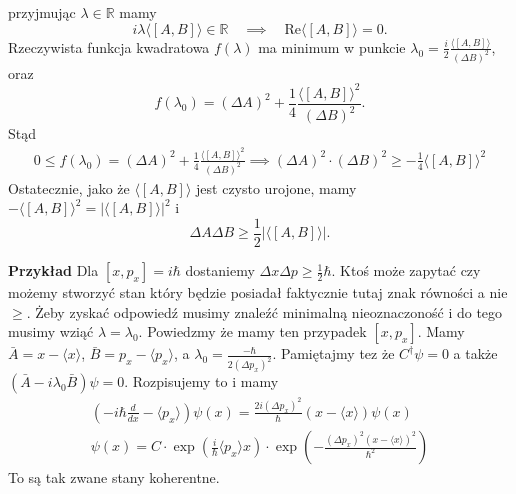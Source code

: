 przyjmując $\lambda \in \mathbb R$ mamy
\begin{equation*}
	i \lambda \langle[A, B]\rangle \in \mathbb R \quad \implies
    \quad \text{Re}\langle[A, B]\rangle = 0.
\end{equation*}
Rzeczywista funkcja kwadratowa $f(\lambda)$ ma minimum w punkcie
$\lambda_0  = \frac{i}{2} \frac{\langle[A, B]\rangle}{(\Delta B)^2}$, oraz
\begin{equation*}
	f(\lambda_0)  = (\Delta A)^2  +
        \frac{1}{4} \frac{\langle[A, B]\rangle^2}{(\Delta B)^2}.
\end{equation*}
Stąd
\begin{align*}
		0 \leq f(\lambda_0)  = (\Delta A)^2 + \frac{1}{4} \frac{\langle[A, B]\rangle^2}{(\Delta B)^2}
	\implies (\Delta A)^2 \cdot (\Delta B)^2 \geq - \frac14\langle[A, B] \rangle^2
\end{align*}
Ostatecznie, jako że $\langle [A, B] \rangle$ jest czysto urojone,
mamy $-\langle [A, B]\rangle^2 = |\langle [A, B]\rangle|^2$ i
\begin{equation*}
    \Delta A \Delta B \geq \frac 1 2 | \langle [A, B] \rangle |.
\end{equation*}


\textbf{Przykład} Dla $[x, p_x] = i \hbar$ dostaniemy $\Delta x \Delta p \geq \frac12 \hbar$.
Ktoś może zapytać czy możemy stworzyć stan który będzie posiadał faktycznie tutaj znak równości a nie $\geq$. 
Żeby zyskać odpowiedź musimy znaleźć minimalną nieoznaczoność i do tego musimy wziąć $\lambda = \lambda_0$. 
Powiedzmy że mamy ten przypadek $[x, p_x]$. Mamy $\bar{A} = x - \langle x \rangle$, $\bar{B} = p_x - \langle p_x \rangle$, a $\lambda_0 = \frac{-\hbar}{2(\Delta p_x)^2}$. 
Pamiętajmy tez że $C^\dagger \psi = 0$ a także $(\bar{A} - i \lambda_0 \bar{B})\psi = 0$. Rozpisujemy to i mamy
\begin{equation*}
	\begin{split}
		\left(-i \hbar \frac{d}{dx} - \langle p_x \rangle \right)\psi(x) = \frac{2i(\Delta p_x)^2}{\hbar} (x - \langle x \rangle) \psi(x) \\
		\psi(x) = C \cdot \exp \left(\frac{i}{\hbar}\langle p_x \rangle x\right) \cdot \exp \left( - \frac{(\Delta p_x)^2 (x - \langle x \rangle)^2}{\hbar^2} \right)
	\end{split}
\end{equation*}
To są tak zwane stany koherentne. 
